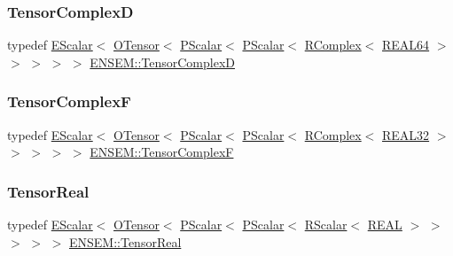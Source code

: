 \mbox{\label{group__defs_ga36b77f1fc618cfdb020d0b95710f1f87}} 
\subsubsection{\texorpdfstring{TensorComplexD}{TensorComplexD}}
{\footnotesize\ttfamily typedef \mbox{\hyperlink{classENSEM_1_1EScalar}{E\+Scalar}}$<$ \mbox{\hyperlink{classENSEM_1_1OTensor}{O\+Tensor}}$<$ \mbox{\hyperlink{classENSEM_1_1PScalar}{P\+Scalar}}$<$ \mbox{\hyperlink{classENSEM_1_1PScalar}{P\+Scalar}}$<$ \mbox{\hyperlink{classENSEM_1_1RComplex}{R\+Complex}}$<$ \mbox{\hyperlink{namespaceENSEM_a85b215b9f1f43715aebee01718e25082}{R\+E\+A\+L64}} $>$ $>$ $>$ $>$ $>$ \mbox{\hyperlink{group__defs_ga36b77f1fc618cfdb020d0b95710f1f87}{E\+N\+S\+E\+M\+::\+Tensor\+ComplexD}}}

\mbox{\label{group__defs_ga7bcf210bf1e9c23606254944d97046d0}} 
\subsubsection{\texorpdfstring{TensorComplexF}{TensorComplexF}}
{\footnotesize\ttfamily typedef \mbox{\hyperlink{classENSEM_1_1EScalar}{E\+Scalar}}$<$ \mbox{\hyperlink{classENSEM_1_1OTensor}{O\+Tensor}}$<$ \mbox{\hyperlink{classENSEM_1_1PScalar}{P\+Scalar}}$<$ \mbox{\hyperlink{classENSEM_1_1PScalar}{P\+Scalar}}$<$ \mbox{\hyperlink{classENSEM_1_1RComplex}{R\+Complex}}$<$ \mbox{\hyperlink{namespaceENSEM_a7540d01191172323e9073283d772576d}{R\+E\+A\+L32}} $>$ $>$ $>$ $>$ $>$ \mbox{\hyperlink{group__defs_ga7bcf210bf1e9c23606254944d97046d0}{E\+N\+S\+E\+M\+::\+Tensor\+ComplexF}}}

\mbox{\label{group__defs_ga958dd8b23f0fe048624bd04c42201408}} 
\subsubsection{\texorpdfstring{TensorReal}{TensorReal}}
{\footnotesize\ttfamily typedef \mbox{\hyperlink{classENSEM_1_1EScalar}{E\+Scalar}}$<$ \mbox{\hyperlink{classENSEM_1_1OTensor}{O\+Tensor}}$<$ \mbox{\hyperlink{classENSEM_1_1PScalar}{P\+Scalar}}$<$ \mbox{\hyperlink{classENSEM_1_1PScalar}{P\+Scalar}}$<$ \mbox{\hyperlink{classENSEM_1_1RScalar}{R\+Scalar}}$<$ \mbox{\hyperlink{namespaceENSEM_a6dd9aa6508168f545c861787e63ddd1e}{R\+E\+AL}} $>$ $>$ $>$ $>$ $>$ \mbox{\hyperlink{group__defs_ga958dd8b23f0fe048624bd04c42201408}{E\+N\+S\+E\+M\+::\+Tensor\+Real}}}

